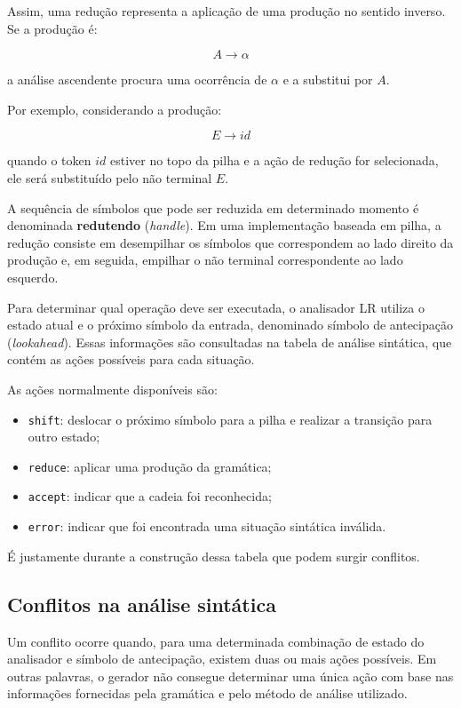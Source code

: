\documentclass[
  brazilian,
  letterpaper,
]{book}
\providecommand{\tightlist}{%
  \setlength{\itemsep}{0pt}\setlength{\parskip}{0pt}}
\theoremstyle{plain}
\theoremstyle{definition}
\theoremstyle{remark}
\begin{document}
Assim, uma redução representa a aplicação de uma produção no sentido
inverso. Se a produção é:

\[
A \rightarrow \alpha
\]

a análise ascendente procura uma ocorrência de \(\alpha\) e a substitui
por \(A\).

Por exemplo, considerando a produção:

\[
E \rightarrow id
\]

quando o token \(id\) estiver no topo da pilha e a ação de redução for
selecionada, ele será substituído pelo não terminal \(E\).

A sequência de símbolos que pode ser reduzida em determinado momento é
denominada \textbf{redutendo} (\emph{handle}). Em uma implementação
baseada em pilha, a redução consiste em desempilhar os símbolos que
correspondem ao lado direito da produção e, em seguida, empilhar o não
terminal correspondente ao lado esquerdo.

Para determinar qual operação deve ser executada, o analisador LR
utiliza o estado atual e o próximo símbolo da entrada, denominado
símbolo de antecipação (\emph{lookahead}). Essas informações são
consultadas na tabela de análise sintática, que contém as ações
possíveis para cada situação.

As ações normalmente disponíveis são:

\begin{itemize}
\tightlist
\item
  \texttt{shift}: deslocar o próximo símbolo para a pilha e realizar a
  transição para outro estado;
\item
  \texttt{reduce}: aplicar uma produção da gramática;
\item
  \texttt{accept}: indicar que a cadeia foi reconhecida;
\item
  \texttt{error}: indicar que foi encontrada uma situação sintática
  inválida.
\end{itemize}

É justamente durante a construção dessa tabela que podem surgir
conflitos.

\subsection{Conflitos na análise
sintática}\label{conflitos-na-anuxe1lise-sintuxe1tica}

Um conflito ocorre quando, para uma determinada combinação de estado do
analisador e símbolo de antecipação, existem duas ou mais ações
possíveis. Em outras palavras, o gerador não consegue determinar uma
única ação com base nas informações fornecidas pela gramática e pelo
método de análise utilizado.
\end{document}
